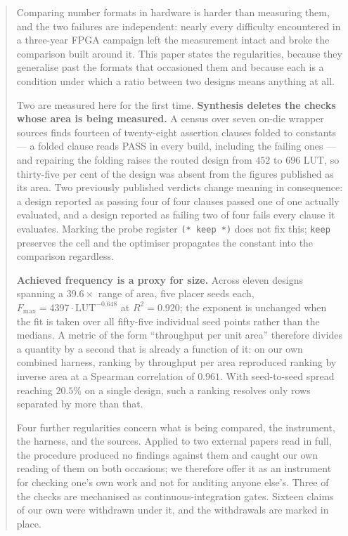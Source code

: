 \documentclass[11pt]{article}
\date{22 September 2026}
\begin{document}
\maketitle

\begin{abstract}
Comparing number formats in hardware is harder than measuring them, and the two
failures are independent: nearly every difficulty encountered in a three-year
FPGA campaign left the measurement intact and broke the comparison built around
it. This paper states the regularities, because they generalise past the formats
that occasioned them and because each is a condition under which a ratio between
two designs means anything at all.

Two are measured here for the first time. \textbf{Synthesis deletes the checks
whose area is being measured.} A census over seven on-die wrapper sources finds
fourteen of twenty-eight assertion clauses folded to constants --- a folded
clause reads PASS in every build, including the failing ones --- and repairing
the folding raises the routed design from $452$ to $696$ LUT, so thirty-five per
cent of the design was absent from the figures published as its area. Two
previously published verdicts change meaning in consequence: a design reported
as passing four of four clauses passed one of one actually evaluated, and a
design reported as failing two of four fails every clause it evaluates. Marking
the probe register \texttt{(* keep *)} does not fix this; \texttt{keep}
preserves the cell and the optimiser propagates the constant into the comparison
regardless.

\textbf{Achieved frequency is a proxy for size.} Across eleven designs spanning
a $39.6\times$ range of area, five placer seeds each,
$F_{\max}=4397\cdot\mathrm{LUT}^{-0.648}$ at $R^2=0.920$; the exponent is
unchanged when the fit is taken over all fifty-five individual seed points
rather than the medians. A metric of the form ``throughput per unit area''
therefore divides a quantity by a second that is already a function of it: on
our own combined harness, ranking by throughput per area reproduced ranking by
inverse area at a Spearman correlation of $0.961$. With seed-to-seed spread
reaching $20.5\%$ on a single design, such a ranking resolves only rows
separated by more than that.

Four further regularities concern what is being compared, the instrument, the
harness, and the sources. Applied to two external papers read in full, the
procedure produced no findings against them and caught our own reading of them
on both occasions; we therefore offer it as an instrument for checking one's own
work and not for auditing anyone else's. Three of the checks are mechanised as
continuous-integration gates. Sixteen claims of our own were withdrawn under it,
and the withdrawals are marked in place.
\end{abstract}

\tableofcontents
\newpage






\end{document}
